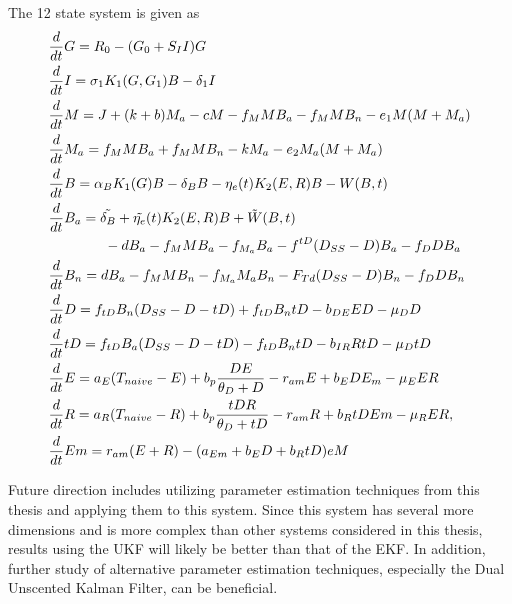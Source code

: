 The 12 state system is given as 
\begin{align*}
    &\frac{d}{dt} G = R_0 - (G_0 + S_I I)G \\ 
    &\frac{d}{dt}  I = \sigma_1 K_1 (G, G_1) B - \delta_1 I \\
    &\frac{d}{dt} M = J +(k+b)M_a -cM - f_M MB_a - f_M MB_n - e_1M(M+M_a) \\
    & \frac{d}{dt} M_a = f_M MB_a +f_M MB_n - kM_a - e_2M_a(M + M_a) \\
    &\frac{d}{dt} B = \alpha_B K_1(G)B - \delta_B B - \eta_e(t)K_2(E,R)B - W(B, t)\\
    & \frac{d}{dt} B_a = \Tilde{\delta_B} + \Tilde{\eta_e} (t)K_2(E,R)B + \Tilde{W}(B, t) \\
    & \quad \quad  \quad \quad - dB_a - f_M MB_a - f_{M_a} B_a - f^{tD}(D_{SS} - D)B_a - f_D DB_a \\
    &\frac{d}{dt} B_n = dB_a - f_M MB_n - f_{M_a} M_a B_n - F_{Td}(D_{SS} - D)B_n - f_D DB_n \\
    & \frac{d}{dt} D = f_{tD}B_n(D_{SS} - D - tD) + f_{tD}B_n tD - b_{DE} ED - \mu_D D \\
    & \frac{d}{dt} tD = f_{tD}B_a(D_{SS} - D - tD) - f_{tD}B_n tD - b_{IR}RtD - \mu_D tD \\
    & \frac{d}{dt} E = a_E (T_{naive} - E) + b_p \frac{DE}{\theta_D + D} - r_{am}E + b_EDE_m - \mu_E ER \\
    & \frac{d}{dt} R = a_R (T_{naive} - R) + b_p \frac{tDR}{\theta_D + tD} - r_{am}R + b_R tDEm - \mu_R ER, \\
    & \frac{d}{dt} Em = r_{am}(E + R) - (a_{Em} + b_E D + b_R tD)eM
\end{align*}

\noindent Future direction includes utilizing parameter estimation techniques from this thesis and applying them to this system. Since this system has several more dimensions and is more complex than other systems considered in this thesis, results using the UKF will likely be better than that of the EKF. In addition, further study of alternative parameter estimation techniques, especially the Dual Unscented Kalman Filter, can be beneficial. 


